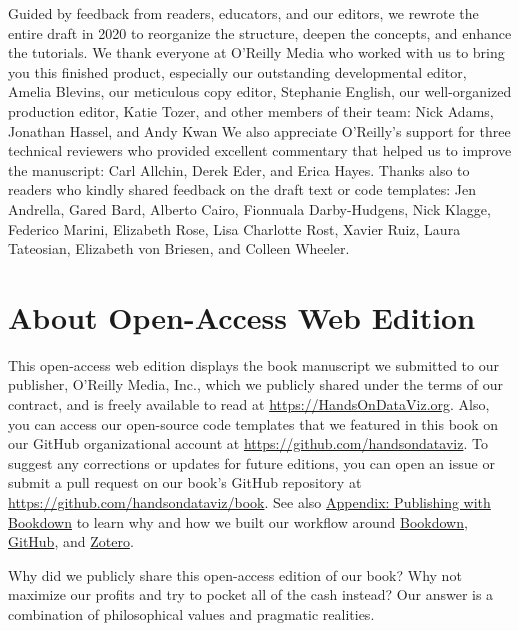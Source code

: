 \documentclass[
  english,
]{book}
\begin{document}
Guided by feedback from readers, educators, and our editors, we rewrote the entire draft in 2020 to reorganize the structure, deepen the concepts, and enhance the tutorials. We thank everyone at O'Reilly Media who worked with us to bring you this finished product, especially our outstanding developmental editor, Amelia Blevins, our meticulous copy editor, Stephanie English, our well-organized production editor, Katie Tozer, and other members of their team: Nick Adams, Jonathan Hassel, and Andy Kwan We also appreciate O'Reilly's support for three technical reviewers who provided excellent commentary that helped us to improve the manuscript: Carl Allchin, Derek Eder, and Erica Hayes. Thanks also to readers who kindly shared feedback on the draft text or code templates: Jen Andrella, Gared Bard, Alberto Cairo, Fionnuala Darby-Hudgens, Nick Klagge, Federico Marini, Elizabeth Rose, Lisa Charlotte Rost, Xavier Ruiz, Laura Tateosian, Elizabeth von Briesen, and Colleen Wheeler.

\hypertarget{open-access}{%
\section*{About Open-Access Web Edition}\label{open-access}}

This open-access web edition displays the book manuscript we submitted to our publisher, O'Reilly Media, Inc., which we publicly shared under the terms of our contract, and is freely available to read at \url{https://HandsOnDataViz.org}. Also, you can access our open-source code templates that we featured in this book on our GitHub organizational account at \url{https://github.com/handsondataviz}. To suggest any corrections or updates for future editions, you can open an issue or submit a pull request on our book's GitHub repository at \url{https://github.com/handsondataviz/book}. See also \href{bookdown.html}{Appendix: Publishing with Bookdown} to learn why and how we built our workflow around \href{https://bookdown.org}{Bookdown}, \href{https://github.com}{GitHub}, and \href{https://zotero.org}{Zotero}.

Why did we publicly share this open-access edition of our book? Why not maximize our profits and try to pocket all of the cash instead? Our answer is a combination of philosophical values and pragmatic realities.
\end{document}
